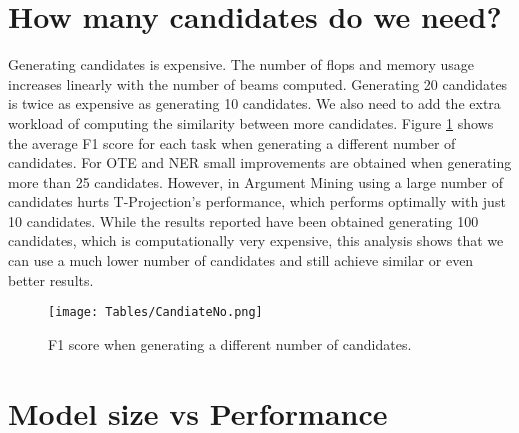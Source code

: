 \documentclass[11pt]{article}
\begin{document}



\clearpage
\appendix


\section{How many candidates do we need?}\label{sec:candidate_no}

Generating candidates is expensive. The number of flops and memory usage
increases linearly with the number of beams computed. Generating 20
candidates is twice as expensive as generating 10 candidates. We also need to
add the extra workload of computing the similarity between more candidates.
Figure \ref{fig:CandidateNo} shows the average F1 score for each task when
generating a different number of candidates. For OTE and NER small improvements are obtained 
when generating more than 25 candidates. However, in Argument Mining
using a large number of candidates hurts T-Projection's performance, which
performs optimally with just 10 candidates. While the results reported
have been obtained generating 100 candidates, which is computationally
very expensive, this analysis shows that we can use a much lower number of
candidates and still achieve similar or even better results. 

\begin{figure}[htb]
\centering
\texttt{[image: Tables/CandiateNo.png]}
\caption{F1 score when generating a different number of candidates.}
\label{fig:CandidateNo}
\end{figure}

\section{Model size vs Performance}\label{sec:ModelSize}

\begin{table}[htb]
    \centering
    \caption{F1 scores of T-Projection when using translation and mT5 models of different size}
    \label{tab:ModelSize}
\end{table}
\end{document}
